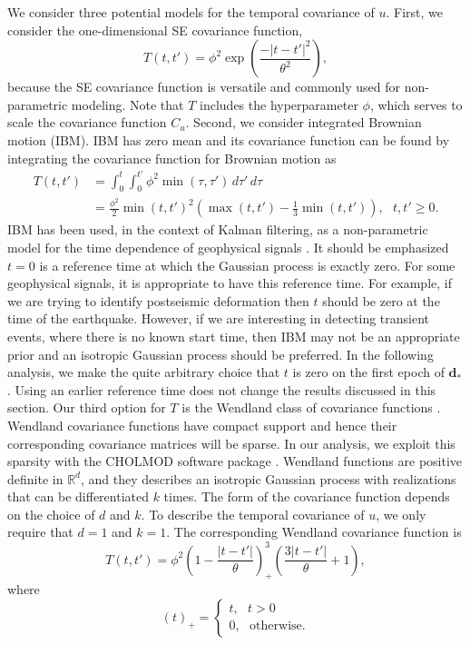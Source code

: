 \documentclass[10pt,letter]{article}
\begin{document}
We consider three potential models for the temporal covariance of $u$. First, we consider the one-dimensional SE covariance function, 
\begin{equation}\label{eq:TimeSE}
T(t,t') = \phi^2\exp\left(\frac{-|t - t'|^2}{\theta^2}\right),
\end{equation}
because the SE covariance function is versatile and commonly used for non-parametric modeling. Note that $T$ includes the hyperparameter $\phi$, which serves to scale the covariance function $C_u$. Second, we consider integrated Brownian motion (IBM). IBM has zero mean and its covariance function can be found by integrating the covariance function for Brownian motion as
\begin{align}\label{eq:IBM}
T(t,t') &= \int_0^t \int_0^{t'} \phi^2 \min(\tau,\tau') \,d\tau'\,d\tau \\
        &= \frac{\phi^2}{2}\min(t,t')^2 \left(\max(t,t') - \frac{1}{3}\min(t,t')\right), \ \ \ t,t' \geq 0.
\end{align}
IBM has been used, in the context of Kalman filtering, as a non-parametric model for the time dependence of geophysical signals \citep[e.g.,][]{Segall1997,McGuire2003,Ohtani2010,Hines2016}. It should be emphasized $t=0$ is a reference time at which the Gaussian process is exactly zero.  For some geophysical signals, it is appropriate to have this reference time. For example, if we are trying to identify postseismic deformation then $t$ should be zero at the time of the earthquake.  However, if we are interesting in detecting transient events, where there is no known start time, then IBM may not be an appropriate prior and an isotropic Gaussian process should be preferred. In the following analysis, we make the quite arbitrary choice that $t$ is zero on the first epoch of $\bm{d}_*$. Using an earlier reference time does not change the results discussed in this section. Our third option for $T$ is the Wendland class of covariance functions \citep{Wendland2005}. Wendland covariance functions have compact support and hence their corresponding covariance matrices will be sparse. In our analysis, we exploit this sparsity with the CHOLMOD software package \citep{Chen2008}.  Wendland functions are positive definite in $\mathbb{R}^d$, and they describes an isotropic Gaussian process with realizations that can be differentiated $k$ times. The form of the covariance function depends on the choice of $d$ and $k$. To describe the temporal covariance of $u$, we only require that $d=1$ and $k=1$. The corresponding Wendland covariance function is 
\begin{equation}\label{eq:Wendland}
T(t,t') = \phi^2\left(1 - \frac{|t - t'|}{\theta}\right)^3_+ \left(\frac{3|t - t'|}{\theta} + 1\right), 
\end{equation}
where
\begin{equation}
(t)_+ = 
\begin{cases}
t, \ \ \ t > 0 \\
0, \ \ \ \mathrm{otherwise}.
\end{cases}
\end{equation}
\end{document}
